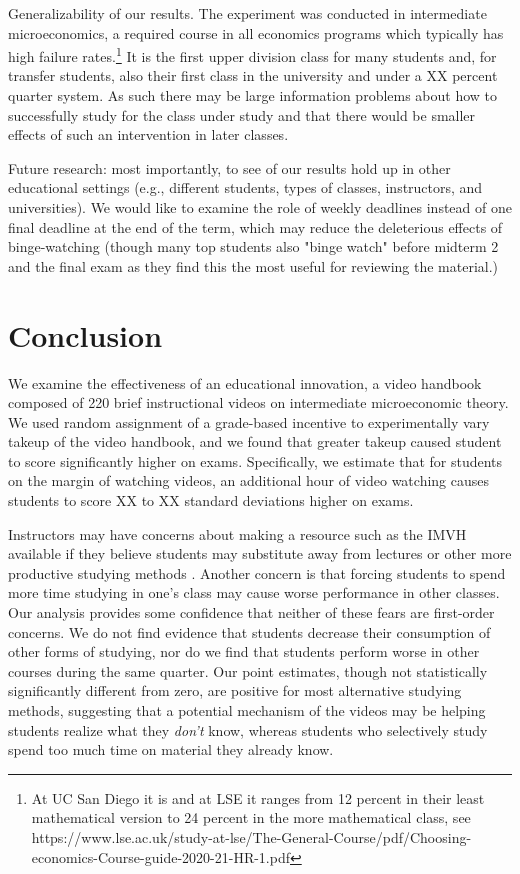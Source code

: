 \documentclass[12pt]{article}
\begin{document}
Generalizability of our results. The experiment was conducted in intermediate microeconomics, a required course in all economics programs which typically has high failure rates.\footnote{At UC San Diego it is and at LSE it ranges from 12 percent in their least mathematical version to 24 percent in the more mathematical class, see https://www.lse.ac.uk/study-at-lse/The-General-Course/pdf/Choosing-economics-Course-guide-2020-21-HR-1.pdf} It is the first upper division class for many students and, for transfer students, also their first class in the university and under a XX percent quarter system. As such there may be large information problems about how to successfully study for the class under study and that there would be smaller effects of such an intervention in later classes.

Future research: most importantly, to see of our results hold up in other educational settings (e.g., different students, types of classes, instructors, and universities). We would like to examine the role of weekly deadlines instead of one final deadline at the end of the term, which may reduce the deleterious effects of binge-watching (though many top students also "binge watch" before midterm 2 and the final exam as they find this the most useful for reviewing the material.)



\section{Conclusion} \label{conclusion}

We examine the effectiveness of an educational innovation, a video handbook composed of 220 brief instructional videos on intermediate microeconomic theory. We used random assignment of a grade-based incentive to experimentally vary takeup of the video handbook, and we found that greater takeup caused student to score significantly higher on exams. Specifically, we estimate that for students on the margin of watching videos, an additional hour of video watching causes students to score XX to XX standard deviations higher on exams.

Instructors may have concerns about making a resource such as the IMVH available if they believe students may substitute away from lectures or other more productive studying methods \textcite{kay2012}. Another concern is that forcing students to spend more time studying in one's class may cause worse performance in other classes. Our analysis provides some confidence that neither of these fears are first-order concerns. We do not find evidence that students decrease their consumption of other forms of studying, nor do we find that students perform worse in other courses during the same quarter. Our point estimates, though not statistically significantly different from zero, are positive for most alternative studying methods, suggesting that a potential mechanism of the videos may be helping students realize what they \textit{don't} know, whereas students who selectively study spend too much time on material they already know.
\end{document}
